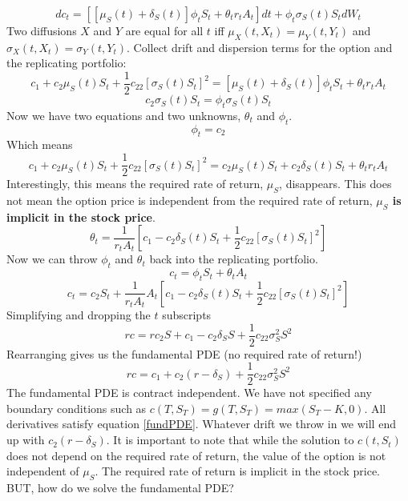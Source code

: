 \begin{equation}
    dc_t= \left[ \left[ \mu_S(t) + \delta_S(t) \right] \phi_t S_t +
    \theta_t r_t A_t \right] dt + \phi_t \sigma_S(t)S_tdW_t
\end{equation}
Two diffusions $X$ and $Y$ are equal for all $t$ iff $\mu_X(t, X_t)=\mu_Y(t,
Y_t)$ and $\sigma_X(t, X_t)=\sigma_Y(t, Y_t)$. Collect drift and dispersion
terms for the option and the replicating portfolio:
\begin{equation}
    c_1+c_2\mu_S(t)S_t+\frac{1}{2}c_{22} \left[ \sigma_S(t)S_t \right] ^2 =
    \left[ \mu_S(t) + \delta_S(t) \right] \phi_t S_t + \theta_t r_t A_t
\end{equation}
\begin{equation}
    c_2\sigma_S(t)S_t=\phi_t\sigma_S(t)S_t
\end{equation}
Now we have two equations and two unknowns, $\theta_t$ and $\phi_t$.
\begin{equation}
    \phi_t=c_2
\end{equation}
Which means
\[
    c_1+c_2\mu_S(t)S_t+\frac{1}{2}c_{22} \left[ \sigma_S(t)S_t \right] ^2 =
    c_2\mu_S(t)S_t + c_2\delta_S(t)S_t + \theta_t r_t A_t
\]
Interestingly, this means the required rate of return, $\mu_S$, disappears.
This does not mean the option price is independent from the required rate of
return, \textbf{$\mu_S$ is implicit in the stock price}.
\begin{equation}
    \theta_t=\frac{1}{r_t A_t} \left[ c_1 - c_2\delta_S(t)S_t + \frac{1}{2}
    c_{22} \left[ \sigma_S(t)S_t \right] ^2 \right]
\end{equation}
Now we can throw $\phi_t$ and $\theta_t$ back into the replicating portfolio.
\[c_t=\phi_tS_t+\theta_tA_t\]
\begin{equation}
    c_t=c_2S_t+\frac{1}{r_tA_t}A_t \left[ c_1-c_2\delta_S(t)S_t + \frac{1}{2}
    c_{22} \left[ \sigma_S(t)S_t \right] ^ 2 \right]
\end{equation}
Simplifying and dropping the $t$ subscripts
\[rc=rc_2S+c_1-c_2\delta_SS+\frac{1}{2}c_{22}\sigma_S^2S^2\]
Rearranging gives us the fundamental PDE (no required rate of return!)
\begin{equation} \label{fundPDE}
    rc=c_1+c_2 \left( r-\delta_S \right) +\frac{1}{2}c_{22}\sigma_S^2S^2
\end{equation}
The fundamental PDE is contract independent. We have not specified any
boundary conditions such as $c(T, S_T)=g(T, S_T)=max(S_T-K, 0)$. All
derivatives satisfy equation \ref{fundPDE}. Whatever drift we throw in we will
end up with $c_2(r-\delta_S)$. It is important to note that while
the solution to $c(t, S_t)$ does not depend on the required rate of return,
the value of the option is not independent of $\mu_S$. The required rate of
return is implicit in the stock price. BUT, how do we solve the fundamental
PDE?
